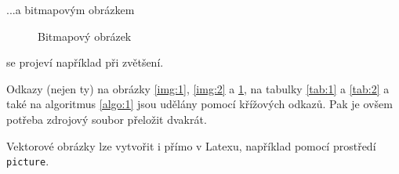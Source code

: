 \documentclass[a4paper,11pt, hidelinks]{article}
\begin{document}
...a bitmapovým obrázkem
\begin{figure}[h]
    \centering
    \caption{Bitmapový obrázek}
    \label{img:3}
\end{figure}

se projeví například při zvětšení.

Odkazy (nejen ty) na obrázky \ref*{img:1}, \ref*{img:2} a \ref*{img:3}, na tabulky \ref*{tab:1} a \ref*{tab:2} a také na algoritmus \ref*{algo:1} jsou udělány pomocí křížových odkazů. Pak je ovšem potřeba zdrojový soubor přeložit dvakrát.

Vektorové obrázky lze vytvořit i přímo v Latexu, například pomocí prostředí \texttt{picture}.

\newpage
\end{document}
